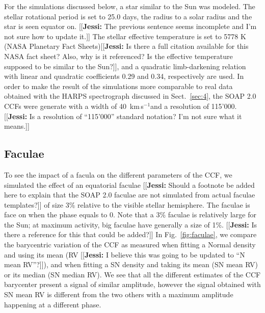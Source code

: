 \documentclass{aa}
\def\kms{\hbox{\,km\,s$^{-1}$}}       %
\newcommand{\jessi}[1]{{\color{Purple}[[\textbf{Jessi: }#1]]}}
\begin{document}
For the simulations discussed below, a star similar to the Sun was modeled. The stellar rotational period is set to 25.0 days, the radius to a solar radius and the star is seen equator on. \jessi{The previous sentence seems incomplete and I'm not sure how to update it.}
The stellar effective temperature is set to 5778 K (NASA Planetary Fact Sheets)\jessi{Is there a full citation available for this NASA fact sheet?  Also, why is it referenced?  Is the effective temperature supposed to be similar to the Sun?}, and a quadratic limb-darkening relation with linear and quadratic coefficients 0.29 and 0.34, respectively \citep[][]{Oshagh-2013a, Claret-2011} are used. 
In order to make the result of the simulations more comparable to real data obtained with the HARPS spectrograph discussed in Sect.~\ref{sec:4}, the SOAP 2.0 CCFs were generate with a width of 40 \kms and a resolution of 115'000.  \jessi{Is a resolution of ``115'000'' standard notation?  I'm not sure what it means.}

\subsection{Faculae} \label{sec:soap.faculae}

To see the impact of a facula on the different parameters of the CCF, we simulated the effect of an equatorial faculae \jessi{Should a footnote be added here to explain that the SOAP 2.0 faculae are not simulated from actual faculae templates?} of size 3\% relative to the visible stellar hemisphere. The faculae is face on when the phase equals to 0. Note that a 3\% faculae is relatively large for the Sun; at maximum activity, big faculae have generally a size of 1\%. \jessi{Is there a reference for this that could be added?}
In Fig.~\ref{fig:faculae}, we compare the barycentric variation of the CCF as measured when fitting a Normal density and using its mean (RV \jessi{I believe this was going to be updated to ``N mean RV''?}), and when fitting a SN density and taking its mean (SN mean RV) or its median (SN median RV). We see that all the different estimates of the CCF barycenter present a signal of similar amplitude, however the signal obtained with SN mean RV is different from the two others with a maximum amplitude happening at a different phase.
\end{document}
